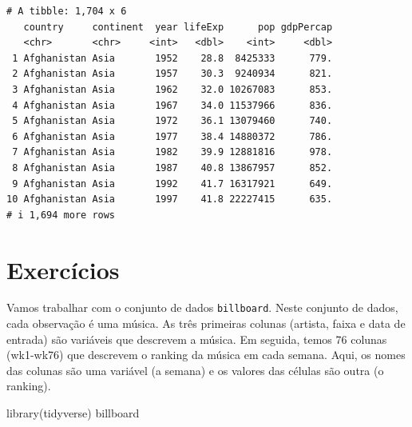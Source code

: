 \documentclass[
  portuguese,
  letterpaper,
  DIV=11,
  numbers=noendperiod]{scrreprt}
\newenvironment{Shaded}{\begin{snugshade}}{\end{snugshade}}
\newcommand{\FunctionTok}[1]{\textcolor[rgb]{0.28,0.35,0.67}{#1}}
\newcommand{\NormalTok}[1]{\textcolor[rgb]{0.00,0.23,0.31}{#1}}
\theoremstyle{definition}
\theoremstyle{remark}
\begin{document}
\begin{verbatim}
# A tibble: 1,704 x 6
   country     continent  year lifeExp      pop gdpPercap
   <chr>       <chr>     <int>   <dbl>    <int>     <dbl>
 1 Afghanistan Asia       1952    28.8  8425333      779.
 2 Afghanistan Asia       1957    30.3  9240934      821.
 3 Afghanistan Asia       1962    32.0 10267083      853.
 4 Afghanistan Asia       1967    34.0 11537966      836.
 5 Afghanistan Asia       1972    36.1 13079460      740.
 6 Afghanistan Asia       1977    38.4 14880372      786.
 7 Afghanistan Asia       1982    39.9 12881816      978.
 8 Afghanistan Asia       1987    40.8 13867957      852.
 9 Afghanistan Asia       1992    41.7 16317921      649.
10 Afghanistan Asia       1997    41.8 22227415      635.
# i 1,694 more rows
\end{verbatim}

\section{Exercícios}\label{sec-ex-dados}

Vamos trabalhar com o conjunto de dados \texttt{billboard}. Neste
conjunto de dados, cada observação é uma música. As três primeiras
colunas (artista, faixa e data de entrada) são variáveis que descrevem a
música. Em seguida, temos 76 colunas (wk1-wk76) que descrevem o ranking
da música em cada semana. Aqui, os nomes das colunas são uma variável (a
semana) e os valores das células são outra (o ranking).

\begin{Shaded}
\begin{Highlighting}[]
\FunctionTok{library}\NormalTok{(tidyverse)}
\NormalTok{billboard}
\end{Highlighting}
\end{Shaded}
\end{document}
